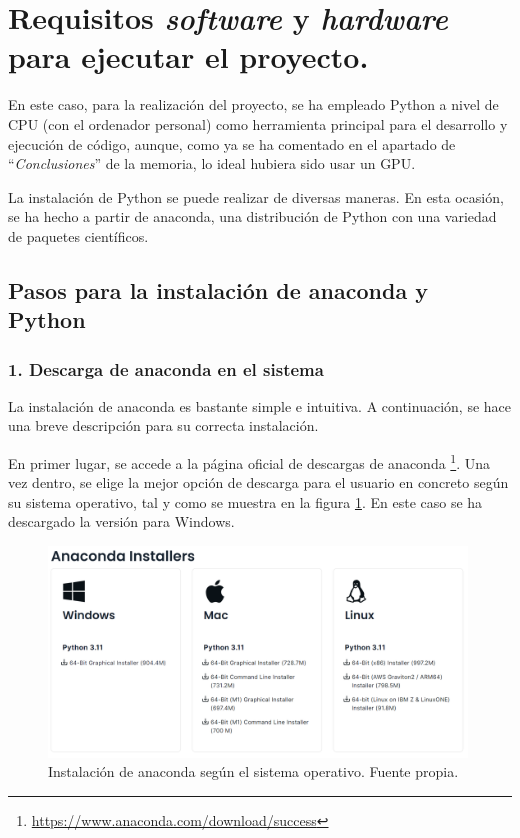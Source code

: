 
\section{Requisitos \textit{software} y \textit{hardware} para ejecutar el proyecto.}

En este caso, para la realización del proyecto, se ha empleado Python a nivel de CPU (con el ordenador personal) como herramienta principal para el desarrollo y ejecución de código, aunque, como ya se ha comentado en el apartado de ``\textit{Conclusiones}'' de la memoria, lo ideal hubiera sido usar un GPU.

La instalación de Python se puede realizar de diversas maneras. En esta ocasión, se ha hecho a partir de anaconda, una distribución de Python con una variedad de paquetes científicos.

\subsection{Pasos para la instalación de anaconda y Python}

\subsubsection{1. Descarga de anaconda en el sistema}
    
    La instalación de anaconda es bastante simple e intuitiva. A continuación, se hace una breve descripción para su correcta instalación.

    En primer lugar, se accede a la página oficial de descargas de anaconda \footnote{\url{https://www.anaconda.com/download/success}}. Una vez dentro, se elige la mejor opción de descarga para el usuario en concreto según su sistema operativo, tal y como se muestra en la figura \ref{fig:sistema_operativo_anaconda}. En este caso se ha descargado la versión para Windows.
    
    \begin{figure}[h]
        \centering
        \includegraphics[width=0.99\textwidth]{img/sistema_operativo_anaconda.PNG}
        \caption{Instalación de anaconda según el sistema operativo. Fuente propia.}
        \label{fig:sistema_operativo_anaconda}
    \end{figure}
    \FloatBarrier
    
